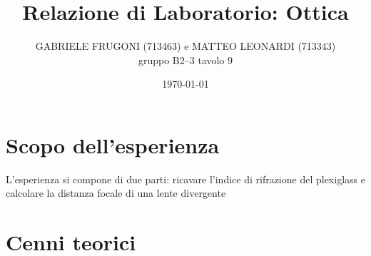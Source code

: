 \documentclass[a4paper,12pt]{article}
\title{Relazione di Laboratorio: Ottica}       %
\author{GABRIELE FRUGONI (713463) e MATTEO LEONARDI (713343)\\ gruppo B2--3 tavolo 9}
\date{\today}
\begin{document}
\maketitle

\section{Scopo dell'esperienza}

L'esperienza si compone di due parti: ricavare l'indice di rifrazione del plexiglass e calcolare la distanza focale di una lente divergente

\section{Cenni teorici}

\end{document}
